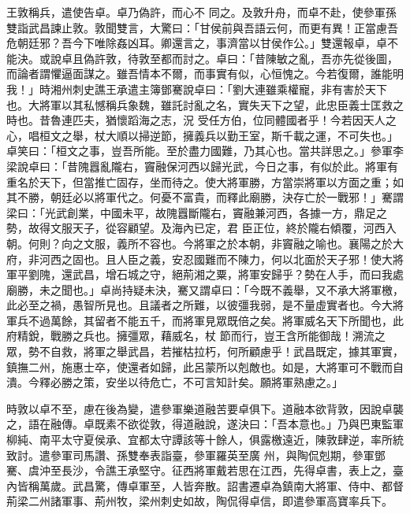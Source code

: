 \begin{pinyinscope}
 王敦稱兵，遣使告卓。卓乃偽許，而心不
 同之。及敦升舟，而卓不赴，使參軍孫雙詣武昌諫止敦。敦聞雙言，大驚曰：「甘侯前與吾語云何，而更有異！正當慮吾危朝廷邪？吾今下唯除姦凶耳。卿還言之，事濟當以甘侯作公。」雙還報卓，卓不能決。或說卓且偽許敦，待敦至都而討之。卓曰：「昔陳敏之亂，吾亦先從後圖，而論者謂懼逼面謀之。雖吾情本不爾，而事實有似，心恒愧之。今若復爾，誰能明我！」時湘州刺史譙王承遣主簿鄧騫說卓曰：「劉大連雖乘權寵，非有害於天下也。大將軍以其私憾稱兵象魏，雖託討亂之名，實失天下之望，此忠臣義士匡救之時也。昔魯連匹夫，猶懷蹈海之志，況
 受任方伯，位同體國者乎！今若因天人之心，唱桓文之舉，杖大順以掃逆節，擁義兵以勤王室，斯千載之運，不可失也。」卓笑曰：「桓文之事，豈吾所能。至於盡力國難，乃其心也。當共詳思之。」參軍李梁說卓曰：「昔隗囂亂隴右，竇融保河西以歸光武，今日之事，有似於此。將軍有重名於天下，但當推亡固存，坐而待之。使大將軍勝，方當崇將軍以方面之重；如其不勝，朝廷必以將軍代之。何憂不富貴，而釋此廟勝，決存亡於一戰邪！」騫謂梁曰：「光武創業，中國未平，故隗囂斷隴右，竇融兼河西，各據一方，鼎足之勢，故得文服天子，從容顧望。及海內已定，君
 臣正位，終於隴右傾覆，河西入朝。何則？向之文服，義所不容也。今將軍之於本朝，非竇融之喻也。襄陽之於大府，非河西之固也。且人臣之義，安忍國難而不陳力，何以北面於天子邪！使大將軍平劉隗，還武昌，增石城之守，絕荊湘之粟，將軍安歸乎？勢在人手，而曰我處廟勝，未之聞也。」卓尚持疑未決，騫又謂卓曰：「今既不義舉，又不承大將軍檄，此必至之禍，愚智所見也。且議者之所難，以彼彊我弱，是不量虛實者也。今大將軍兵不過萬餘，其留者不能五千，而將軍見眾既倍之矣。將軍威名天下所聞也，此府精銳，戰勝之兵也。擁彊眾，藉威名，杖
 節而行，豈王含所能御哉！溯流之眾，勢不自救，將軍之舉武昌，若摧枯拉朽，何所顧慮乎！武昌既定，據其軍實，鎮撫二州，施惠士卒，使還者如歸，此呂蒙所以剋敵也。如是，大將軍可不戰而自潰。今釋必勝之策，安坐以待危亡，不可言知計矣。願將軍熟慮之。」



 時敦以卓不至，慮在後為變，遣參軍樂道融苦要卓俱下。道融本欲背敦，因說卓襲之，語在融傳。卓既素不欲從敦，得道融說，遂決曰：「吾本意也。」乃與巴東監軍柳純、南平太守夏侯承、宜都太守譚該等十餘人，俱露檄遠近，陳敦肆逆，率所統致討。遣參軍司馬讚、孫雙奉表詣臺，參軍羅英至廣
 州，與陶侃剋期，參軍鄧騫、虞沖至長沙，令譙王承堅守。征西將軍戴若思在江西，先得卓書，表上之，臺內皆稱萬歲。武昌驚，傳卓軍至，人皆奔散。詔書遷卓為鎮南大將軍、侍中、都督荊梁二州諸軍事、荊州牧，梁州刺史如故，陶侃得卓信，即遣參軍高寶率兵下。




\end{pinyinscope}
